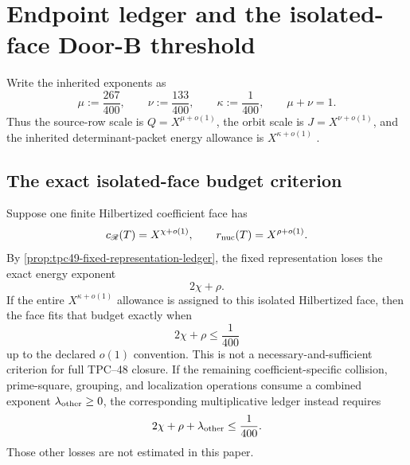 \section{Endpoint ledger and the isolated-face Door-B threshold}
\label{sec:tpc49-endpoint}

Write the inherited exponents as
\begin{equation}
 \mu:=\frac{267}{400},
 \qquad
 \nu:=\frac{133}{400},
 \qquad
 \kappa:=\frac1{400},
 \qquad
 \mu+\nu=1.
 \label{eq:tpc49-endpoint-exponents}
\end{equation}
Thus the source-row scale is \(Q=X^{\mu+o(1)}\), the orbit scale is
\(J=X^{\nu+o(1)}\), and the inherited determinant-packet energy
allowance is \(X^{\kappa+o(1)}\)
\citep{WangTPC45,WangTPC47,WangTPC48}.

\subsection{The exact isolated-face budget criterion}

Suppose one finite Hilbertized coefficient face has
\begin{equation}
 c_{\mathscr R}(T)=X^{\chi+o(1)},
 \qquad
 r_{\rm nuc}(T)=X^{\rho+o(1)}.
 \label{eq:tpc49-endpoint-condition-exponents}
\end{equation}
By \cref{prop:tpc49-fixed-representation-ledger}, the fixed
representation loses the exact energy exponent
\begin{equation}
 2\chi+\rho.
 \label{eq:tpc49-exact-loss-exponent}
\end{equation}
If the entire \(X^{\kappa+o(1)}\) allowance is assigned to this isolated
Hilbertized face, then the face fits that budget exactly when
\begin{equation}
 \boxed{2\chi+\rho\le\frac1{400}}
 \label{eq:tpc49-endpoint-exact-condition}
\end{equation}
up to the declared \(o(1)\) convention.  This is not a
necessary-and-sufficient criterion for full TPC--48 closure.  If the remaining
coefficient-specific collision, prime-square, grouping, and localization
operations consume a combined exponent \(\lambda_{\rm other}\ge0\), the
corresponding multiplicative ledger instead requires
\begin{equation}
 2\chi+\rho+\lambda_{\rm other}\le\frac1{400}.
 \label{eq:tpc49-full-budget-ledger}
\end{equation}
Those other losses are not estimated in this paper.

